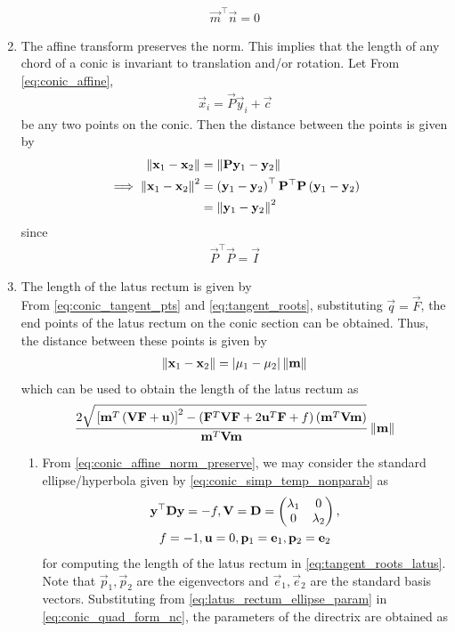 \documentclass[journal,12pt,twocolumn]{IEEEtran}
\renewcommand\thesection{\arabic{section}}
\renewcommand\thesubsection{\thesection.\arabic{subsection}}
\begin{document}
\begin{enumerate}[label=\thesubsection.\arabic*.,ref=\thesubsection.\theenumi]
\begin{align}
	\vec{m}^{\top} \vec{n} = 0
\end{align}
\item The affine transform preserves the norm.  This implies that the length of any chord of a conic
	is invariant to translation and/or rotation.
	\solution Let 
From \eqref{eq:conic_affine}, 
\begin{align}
\vec{x}_i = \vec{P}\vec{y}_i+\vec{c} 
\label{eq:conic_affine_pts}
\end{align}
be any two points on the conic.  Then the distance between the points is given by 
\begin{align}
	\left\lVert\mathbf{x}_1-\mathbf{x}_2 \right\rVert &= \left\lVert\mathbf{P}	\mathbf{y}_1 -\mathbf{y}_2 \right\rVert
	\\
	\implies \left\lVert\mathbf{x}_1-\mathbf{x}_2 \right\rVert^2 &= 		\left(\mathbf{y}_1 -\mathbf{y}_2 \right)^{\top}\mathbf{P}^{\top}\mathbf{P}\left(\mathbf{y}_1 -\mathbf{y}_2 \right)
	\\
	&= 		\left\lVert\mathbf{y}_1 -\mathbf{y}_2 \right\rVert^2
\label{eq:conic_affine_norm_preserve}
\end{align}
since 
\begin{align}
	\vec{P}^{\top}\vec{P} = \vec{I}
\end{align}
\item The length of the latus rectum is given by 
	\solution 
\\
From 
\eqref{eq:conic_tangent_pts}
and
\eqref{eq:tangent_roots}, substituting $\vec{q} = \vec{F}$, the end points of the latus rectum on the conic
section can be obtained.  Thus, the distance between these points is given by 
\begin{align}
	\left\lVert\mathbf{x}_1-\mathbf{x}_2\right\rVert =  \left\vert\mu_1-\mu_2\right\vert \left\lVert\mathbf{m}\right\rVert
\label{eq:conic_tangent_pts_dist}
\end{align}
which can be used to obtain the length of the latus rectum as 
	{\tiny
\begin{multline}
 \frac{2\sqrt{
{}\left[
\mathbf{m}^T\left(\mathbf{V}\mathbf{F}+\mathbf{u}\right)
\right]^2
-
\left(
\mathbf{F}^T\mathbf{V}\mathbf{F} + 2\mathbf{u}^T\mathbf{F} +f
\right)
\left(\mathbf{m}^T\mathbf{V}\mathbf{m}\right)
}
}
{
\mathbf{m}^T\mathbf{V}\mathbf{m}
}\left\lVert\mathbf{m}\right\rVert
\label{eq:tangent_roots_latus}
\end{multline}
}
\begin{enumerate}
\item 
From \eqref{eq:conic_affine_norm_preserve}, we may consider the standard ellipse/hyperbola given by 
    \eqref{eq:conic_simp_temp_nonparab} as
  \begin{multline}
    \mathbf{y}^{\top}\mathbf{D}\mathbf{y} = -f,
	\mathbf{V} =     \mathbf{D} = \begin{pmatrix}\lambda_1 & 0 \\ 0 &\lambda_2\end{pmatrix},
	  \\
	   f = -1, \mathbf{u} = 0, \mathbf{p}_1 = \mathbf{e}_1, \mathbf{p}_2 = \mathbf{e}_2
	    \label{eq:latus_rectum_ellipse_param}
\end{multline}
for computing the length of the latus rectum in 
	  \eqref{eq:tangent_roots_latus}. Note that $\vec{p}_1, \vec{p}_2$ are the eigenvectors and $\vec{e}_1, \vec{e}_2$ are the standard basis vectors.  Substituting from 
	    \eqref{eq:latus_rectum_ellipse_param} in
\eqref{eq:conic_quad_form_nc},
	     the parameters of the directrix are obtained as 


\end{enumerate}
\end{enumerate}
\end{document}
